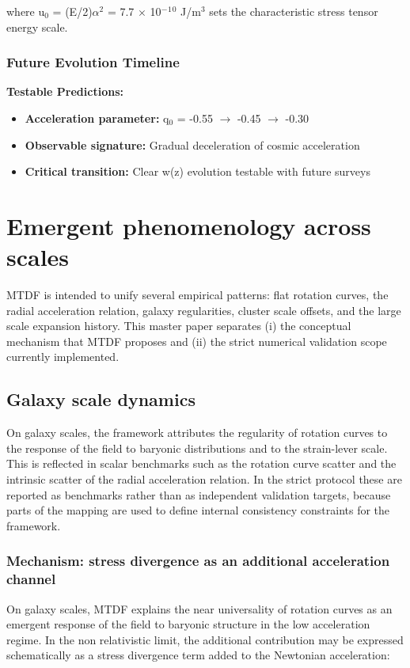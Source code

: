 \documentclass[11pt,a4paper]{article}
\begin{document}
where u$_{0}$ = (E/\allowbreak{}2)$\alpha$$^{2}$ = 7.7 $\times$ 10$^{-}$$^{1}$$^{0}$ J/\allowbreak{}m$^{3}$ sets the characteristic stress tensor energy scale.

\subsubsection{Future Evolution Timeline}
\textbf{Testable Predictions:}

\begin{itemize}
  \item \textbf{Acceleration parameter:} q$_{0}$ = -0.55 $\rightarrow$ -0.45 $\rightarrow$ -0.30
  \item \textbf{Observable signature:} Gradual deceleration of cosmic acceleration
  \item \textbf{Critical transition:} Clear w(z) evolution testable with future surveys
\end{itemize}

\section{Emergent phenomenology across scales}
\label{sec:sec4}
MTDF is intended to unify several empirical patterns: flat rotation curves, the radial acceleration relation, galaxy regularities, cluster scale offsets, and the large scale expansion history. This master paper separates (i) the conceptual mechanism that MTDF proposes and (ii) the strict numerical validation scope currently implemented.

\subsection{Galaxy scale dynamics}
On galaxy scales, the framework attributes the regularity of rotation curves to the response of the field to baryonic distributions and to the strain-lever scale. This is reflected in scalar benchmarks such as the rotation curve scatter and the intrinsic scatter of the radial acceleration relation. In the strict protocol these are reported as benchmarks rather than as independent validation targets, because parts of the mapping are used to define internal consistency constraints for the framework.

\subsubsection{Mechanism: stress divergence as an additional acceleration channel}
On galaxy scales, MTDF explains the near universality of rotation curves as an emergent response of the field to baryonic structure in the low acceleration regime. In the non relativistic limit, the additional contribution may be expressed schematically as a stress divergence term added to the Newtonian acceleration:
\end{document}
